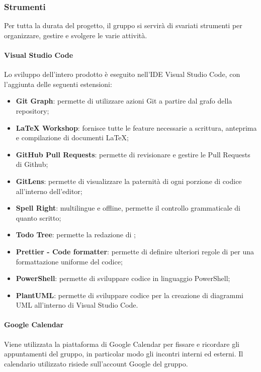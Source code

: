 \subsubsection{Strumenti}
Per tutta la durata del progetto, il gruppo si servirà di svariati strumenti per organizzare, gestire e svolgere le varie attività.
\paragraph{Visual Studio Code}
Lo sviluppo dell'intero prodotto è eseguito nell'IDE Visual Studio Code, con l'aggiunta delle seguenti estensioni:
\begin{itemize}
  \item \textbf{Git Graph}: permette di utilizzare azioni Git a partire dal grafo della repository;
  \item \textbf{LaTeX Workshop}: fornisce tutte le feature necessarie a scrittura, anteprima e compilazione di documenti \LaTeX;
  \item \textbf{GitHub Pull Requests}: permette di revisionare e gestire le Pull Requests di Github;
  \item \textbf{GitLens}: permette di visualizzare la paternità di ogni porzione di codice all'interno dell'editor;
  \item \textbf{Spell Right}:  multilingue e offline, permette il controllo grammaticale di quanto scritto;
  \item \textbf{Todo Tree}: permette la redazione di ;
  \item \textbf{Prettier - Code formatter}: permette di definire ulteriori regole di  per una formattazione uniforme del codice;
  \item \textbf{PowerShell}: permette di sviluppare codice in linguaggio PowerShell;
  \item \textbf{PlantUML}: permette di sviluppare codice per la creazione di diagrammi UML all'interno di Visual Studio Code.
\end{itemize}

\paragraph{Google Calendar}
Viene utilizzata la piattaforma di Google Calendar per fissare e ricordare gli appuntamenti del gruppo, in particolar modo gli incontri interni ed esterni. Il calendario utilizzato risiede sull'account Google del gruppo.

